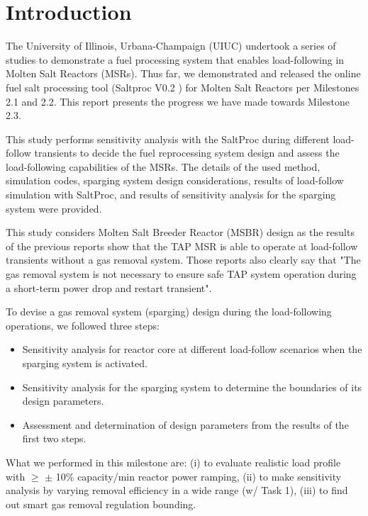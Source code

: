 \section{Introduction}

    The University of Illinois, Urbana-Champaign (UIUC) undertook a series of 
    studies to demonstrate a fuel processing system that enables load-following 
    in Molten Salt Reactors (MSRs). Thus far, we demonstrated and released the 
    online fuel salt processing tool (Saltproc V0.2 
    \cite{rykhlevskii_saltproc_2018}) for Molten Salt Reactors per Milestones 
    2.1 and 2.2. This report presents the progress we have made towards 
    Milestone 2.3.

    This study performs sensitivity analysis with the SaltProc during different 
    load-follow transients to decide the fuel reprocessing system design and 
    assess the load-following capabilities of the MSRs. The details of the used 
    method, simulation codes, sparging system design considerations, results of 
    load-follow simulation with SaltProc, and results of sensitivity analysis 
    for the sparging system were provided.

    This study considers Molten Salt Breeder Reactor (MSBR) 
    \cite{robertson_conceptual_1971} design as the results of the previous 
    reports \cite{rykhlevskii_milestone_2019} show that the TAP MSR is able to 
    operate at load-follow transients without a gas removal system. Those 
    reports also clearly say that "The gas removal system is not necessary to 
    ensure safe TAP system operation during a short-term power drop and restart 
    transient".

    To devise a gas removal system (sparging) design during the load-following 
    operations, we followed three steps:
    \begin{itemize}
        \item Sensitivity analysis for reactor core at different load-follow 
                scenarios when the sparging system is activated.
        \item Sensitivity analysis for the sparging system to determine the 
                boundaries of its design parameters.
        \item Assessment and determination of design parameters from the 
                results of the first two steps.
    \end{itemize}

    What we performed in this milestone are: (i) to evaluate realistic load 
    profile with $\geq$ $\pm$ 10\% capacity/min reactor power ramping, (ii) to 
    make sensitivity analysis by varying removal efficiency in a wide range (w/ 
    Task 1), (iii) to find out smart gas removal regulation bounding.

